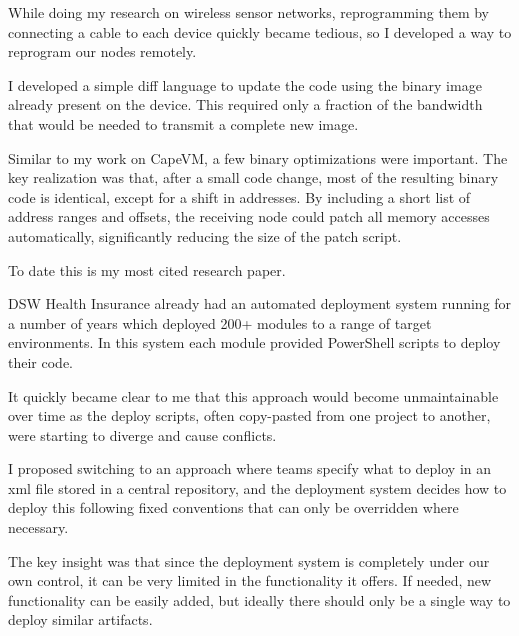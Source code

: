 \documentclass[10pt,a4paper]{../altacv}
\begin{document}
\begin{fullwidth}
\bigskip\bigskip

While doing my research on wireless sensor networks, reprogramming them by connecting a cable to each device quickly became tedious, so I developed a way to reprogram our nodes remotely.

\medskip\medskip

I developed a simple diff language to update the code using the binary image already present on the device. This required only a fraction of the bandwidth that would be needed to transmit a complete new image.

\medskip\medskip

Similar to my work on CapeVM, a few binary optimizations were important. The key realization was that, after a small code change, most of the resulting binary code is identical, except for a shift in addresses. By including a short list of address ranges and offsets, the receiving node could patch all memory accesses automatically, significantly reducing the size of the patch script.

\medskip\medskip

To date this is my most cited research paper.

\bigskip\bigskip

\newpage

DSW Health Insurance already had an automated deployment system running for a number of years which deployed 200+ modules to a range of target environments. In this system each module provided PowerShell scripts to deploy their code.

\medskip\medskip

It quickly became clear to me that this approach would become unmaintainable over time as the deploy scripts, often copy-pasted from one project to another, were starting to diverge and cause conflicts.

\medskip\medskip

I proposed switching to an approach where teams specify what to deploy in an xml file stored in a central repository, and the deployment system decides how to deploy this following fixed conventions that can only be overridden where necessary.

\medskip\medskip

The key insight was that since the deployment system is completely under our own control, it can be very limited in the functionality it offers. If needed, new functionality can be easily added, but ideally there should only be a single way to deploy similar artifacts.


\end{fullwidth}
\end{document}
